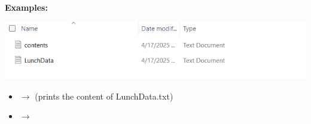 		\textbf{Examples:}\\
			\begin{center}
			\includegraphics[scale=.65]{imgs/FileDirectoryExample.PNG}
			\end{center}
		\begin{itemize}
			\item {}  $\rightarrow$ 
				(prints the content of LunchData.txt)
			\item {}  $\rightarrow$ 
		\end{itemize}



